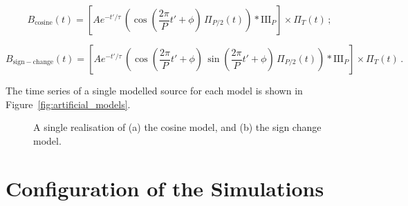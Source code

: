 \begin{equation}
B_{\mathrm{cosine}}(t) = \left[ A e^{-t'/\tau} \, \left( \cos{\left(\frac{2\pi}{P}t' + \phi\right)} \, \Pi_{P/2}(t) \right) * \mathrm{III}_{P} \right] \times \Pi_{T}(t) \, ;
\label{eq:cosine_model}
\end{equation}


\begin{equation}
B_{\mathrm{sign-change}}(t) = \left[ A e^{-t'/\tau} \, \left( \cos{\left(\frac{2\pi}{P}t' + \phi\right)} \, \sin{\left(\frac{2\pi}{P}t' + \phi\right)} \, \Pi_{P/2}(t) \right) * \mathrm{III}_{P} \right] \times \Pi_{T}(t) \, .
\label{eq:sgn_cng_model}
\end{equation}

The time series of a single modelled source for each model is shown in Figure~\ref{fig:artificial_models}.

\begin{figure}[ht!]
	\centering
	\qquad
	\caption{A single realisation of (a) the cosine model, and (b) the sign change model.}  
	\label{fig:artificial_TS}
\end{figure}


\section{Configuration of the Simulations}

